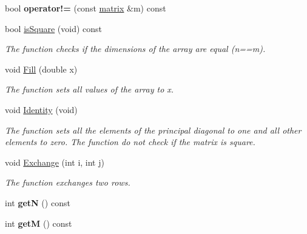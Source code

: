 \begin{DoxyCompactItemize}
\item 
\mbox{\label{classmatrix_a9e37d73f37a3041272675c7c5d4b6782}} 
bool {\bfseries operator!=} (const \mbox{\hyperlink{classmatrix}{matrix}} \&m) const
\item 
\mbox{\label{classmatrix_a2c882f692bfbca08d6f093a871a3fc7b}} 
bool \mbox{\hyperlink{classmatrix_a2c882f692bfbca08d6f093a871a3fc7b}{is\+Square}} (void) const
\begin{DoxyCompactList}\small\item\em The function checks if the dimensions of the array are equal (n==m). \end{DoxyCompactList}\item 
\mbox{\label{classmatrix_a317b8bf6d740cabf51ab9fd803e62a2c}} 
void \mbox{\hyperlink{classmatrix_a317b8bf6d740cabf51ab9fd803e62a2c}{Fill}} (double x)
\begin{DoxyCompactList}\small\item\em The function sets all values of the array to x. \end{DoxyCompactList}\item 
\mbox{\label{classmatrix_a6f3af10a8808eebe72f1c41da20404f0}} 
void \mbox{\hyperlink{classmatrix_a6f3af10a8808eebe72f1c41da20404f0}{Identity}} (void)
\begin{DoxyCompactList}\small\item\em The function sets all the elements of the principal diagonal to one and all other elements to zero. The function do not check if the matrix is square. \end{DoxyCompactList}\item 
\mbox{\label{classmatrix_aa24c1fbce7909df96d09ba75174f5859}} 
void \mbox{\hyperlink{classmatrix_aa24c1fbce7909df96d09ba75174f5859}{Exchange}} (int i, int j)
\begin{DoxyCompactList}\small\item\em The function exchanges two rows. \end{DoxyCompactList}\item 
\mbox{\label{classmatrix_aeb1dcd693cd6d18b731a2177f722eb6a}} 
int {\bfseries getN} () const
\item 
\mbox{\label{classmatrix_a5f3532e4269da537bcb0a1377c49c2da}} 
int {\bfseries getM} () const
\end{DoxyCompactItemize}
